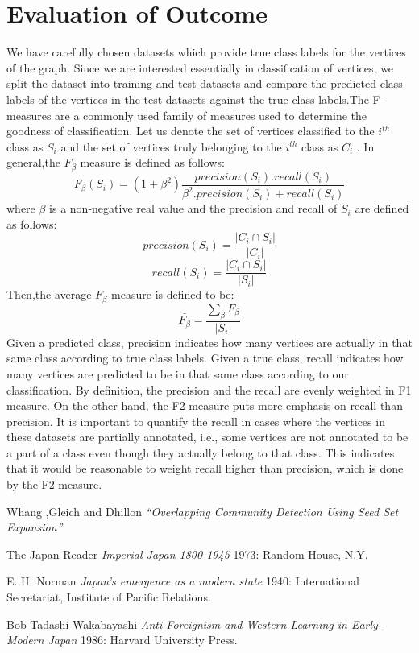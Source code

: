 \documentclass{article}
\begin{document}
\section*{Evaluation of Outcome}
We have carefully chosen datasets which provide true class labels for the vertices of the graph. Since we are interested essentially in classification of vertices, we split the dataset into training and test datasets and compare the predicted class labels of the vertices in the test datasets against the true class labels.The F-measures are a commonly used family of measures used to determine the goodness of classification. Let us denote the set of vertices classified to the $i^{th}$ class as $S_i$ and the set of vertices truly belonging to the $i^{th}$ class as $C_i$ . In general,the $F_{\beta}$ measure is defined as follows:
\begin{equation}
F_{\beta}(S_{i}) = (1+{\beta^2}) \frac{precision(S_{i}).recall(S_{i})}{{\beta^2}.precision(S_{i})+recall(S_{i})}
\end{equation}
where $\beta$ is a non-negative real value and the precision and recall of $S_i$ are defined as follows:
\begin{equation}
precision({S_{i}}) = \frac{ \left|{{C_{i}} \cap {S_{i}}}\right| }{ \left|{C_{i}}\right| } 
\end{equation} 
\begin{equation}
recall({S_{i}}) = \frac{ \left|{{C_{i}} \cap {S_{i}}}\right| }{ \left| {S_{i}} \right| } 
\end{equation} 
Then,the average $F_{\beta}$ measure is defined to be:-
\begin{equation}
\bar{F_{\beta}} = \frac{\sum_{\beta}{F_{\beta}}}{ \left|{S_{i}}\right| }
\end{equation}
Given a predicted class, precision indicates how many vertices are actually in that same class according to true class labels. Given a true class, recall indicates how many vertices are predicted to be in that same class according to our classification. By definition, the precision and the recall are evenly weighted in F1 measure. On the other hand, the F2 measure puts more emphasis on recall than precision. It is important to quantify the recall in cases where the vertices in these datasets are partially annotated, i.e., some vertices are not annotated to be a part of a class even though they actually belong to that class. This indicates that it would be reasonable to weight recall higher than precision, which is done by the F2 measure.

\begin{thebibliography}{1}
 Whang ,Gleich and Dhillon {\em ``Overlapping Community Detection
Using Seed Set Expansion''} 

  The Japan Reader {\em Imperial Japan 1800-1945} 1973:
  Random House, N.Y.

 E. H. Norman {\em Japan's emergence as a modern
  state} 1940: International Secretariat, Institute of Pacific
  Relations.

 Bob Tadashi Wakabayashi {\em Anti-Foreignism and Western
  Learning in Early-Modern Japan} 1986: Harvard University Press.
\end{thebibliography}
\end{document}
